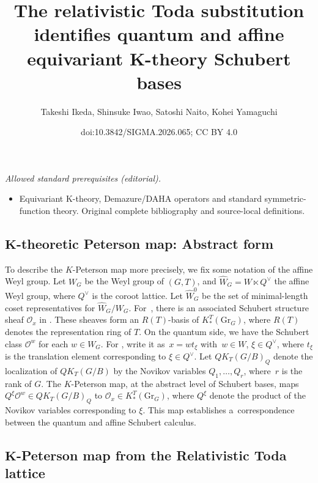 \documentclass[10pt,a4paper]{amsart}
\title{The relativistic Toda substitution identifies quantum and affine equivariant K-theory Schubert bases}
\author{Takeshi Ikeda, Shinsuke Iwao, Satoshi Naito, Kohei Yamaguchi}
\date{doi:10.3842/SIGMA.2026.065; CC BY 4.0}
\numberwithin{equation}{section}
\newcommand{\Gr}{\mathrm{Gr}}
\newcommand{\Rep}{{R(T)}}
\theoremstyle{definition}
\begin{document}
\maketitle
\noindent\textit{Allowed standard prerequisites (editorial).}\begin{itemize}
\item Equivariant K-theory, Demazure/DAHA operators and standard symmetric-function theory. Original complete bibliography and source-local definitions.
\end{itemize}\medskip
\subsection[K-theoretic Peterson map: abstract form]{$\boldsymbol{K}$-theoretic Peterson map: Abstract form}
To describe the $K$-Peterson map more precisely, we fix some notation of the affine Weyl group.
Let $W_G$ be the Weyl group of $(G,T)$, and $\hat{W}_G=W\ltimes Q^\vee$ the affine Weyl group,
 where $Q^\vee$ is the coroot lattice.
 Let $\hat{W}_G^0$ be the set of minimal-length coset representatives for
 $\hat{W}_G/W_G$. For~, there is
 an associated Schubert structure sheaf $\mathscr{O}_x$ in \smash{$K_*^T(\Gr_{G})$}.
 These sheaves form an $\Rep$-basis of $K_*^T(\Gr_{G})$, where $\Rep$ denotes the representation ring of $T$.
On the quantum side, we have the Schubert class $\mathscr{O}^w$ for each $w\in W_G$.
 For ,
 write it as~${x=wt_\xi}$ with~${w\in W}$, $\xi\in Q^\vee$,
 where $t_\xi$ is the translation element corresponding to $\xi\in Q^\vee$.
 Let $QK_T(G/B)_Q$ denote the localization of $QK_T(G/B)$ by
 the Novikov variables $Q_1,\dots,Q_r$, where~$r$ is the rank of $G$.
 The $K$-Peterson map, at the abstract level of Schubert bases,
maps $Q^\xi\mathscr{O}^w \in QK_T(G/B)_Q$ to $\mathscr{O}_{x}\in K_*^T(\Gr_G)$, where $Q^\xi$ denote the product of the Novikov variables corresponding to $\xi$. This map establishes a~correspondence between the quantum and affine Schubert calculus.

\subsection[K-Peterson map from the Relativistic Toda lattice]{$\boldsymbol{K}$-Peterson map from the Relativistic Toda lattice}
\end{document}
